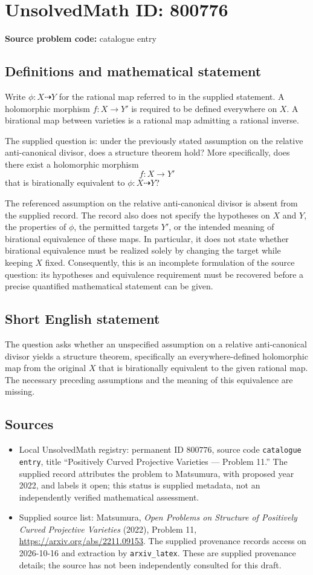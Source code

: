 \documentclass[11pt]{article}
\begin{document}
\section*{UnsolvedMath ID: 800776}
\textbf{Source problem code:} catalogue entry
\subsection{Definitions and mathematical statement}
Write \(\phi\colon X\dashrightarrow Y\) for the rational map referred to in the supplied statement. A holomorphic morphism \(f\colon X\to Y'\) is required to be defined everywhere on \(X\). A birational map between varieties is a rational map admitting a rational inverse.

The supplied question is: under the previously stated assumption on the relative anti-canonical divisor, does a structure theorem hold? More specifically, does there exist a holomorphic morphism
\[
f\colon X\longrightarrow Y'
\]
that is birationally equivalent to \(\phi\colon X\dashrightarrow Y\)?

The referenced assumption on the relative anti-canonical divisor is absent from the supplied record. The record also does not specify the hypotheses on \(X\) and \(Y\), the properties of \(\phi\), the permitted targets \(Y'\), or the intended meaning of birational equivalence of these maps. In particular, it does not state whether birational equivalence must be realized solely by changing the target while keeping \(X\) fixed. Consequently, this is an incomplete formulation of the source question: its hypotheses and equivalence requirement must be recovered before a precise quantified mathematical statement can be given.
\subsection{Short English statement}
The question asks whether an unspecified assumption on a relative anti-canonical divisor yields a structure theorem, specifically an everywhere-defined holomorphic map from the original \(X\) that is birationally equivalent to the given rational map. The necessary preceding assumptions and the meaning of this equivalence are missing.
\subsection{Sources}
\begin{itemize}
\item Local UnsolvedMath registry: permanent ID \(800776\), source code \texttt{catalogue entry}, title ``Positively Curved Projective Varieties --- Problem 11.'' The supplied record attributes the problem to Matsumura, with proposed year 2022, and labels it open; this status is supplied metadata, not an independently verified mathematical assessment.
\item Supplied source list: Matsumura, \emph{Open Problems on Structure of Positively Curved Projective Varieties} (2022), Problem 11, \url{https://arxiv.org/abs/2211.09153}. The supplied provenance records access on 2026-10-16 and extraction by \texttt{arxiv\_latex}. These are supplied provenance details; the source has not been independently consulted for this draft.
\end{itemize}
\end{document}
